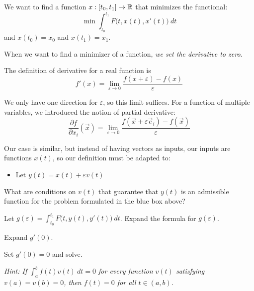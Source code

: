 \documentclass{workbook}
\begin{document}
\begin{slide}
\question

\begin{problem}

We want to find a function $x: [t_0,t_1] \to \mathbb{R}$ that minimizes the functional:
\[ \min \int_{t_0}^{t_1} F \big(t, x(t), x'(t) \big) ~dt \]
and $x(t_0)=x_0$ and $x(t_1)=x_1$.
\end{problem}

When we want to find a minimizer of a function, \textsl{we set the derivative to zero}.



\begin{parts}
	\item The definition of derivative for a real function is
	\[ f'(x) = \lim_{\varepsilon \to 0} \frac{f(x+\varepsilon)-f(x)}{\varepsilon} \]
	
	We only have one direction for $\varepsilon$, so this limit suffices. For a function of multiple variables, we introduced the notion of partial derivative:
	\[ \frac{\partial f}{\partial x_i}(\vec{x}) = \lim_{\varepsilon \to 0} \frac{f(\vec{x}+\varepsilon \vec{e}_i)-f(\vec{x})}{\varepsilon} \]
	
	Our case is similar, but instead of having vectors as inputs, our inputs are functions $x(t)$, so our definition must be adapted to:
	\begin{itemize}
		\item Let $y(t) = x(t) + \varepsilon v(t)$
	\end{itemize}	
	
	What are conditions on $v(t)$ that guarantee that $y(t)$ is an admissible function for the problem formulated in the blue box above?
	
	\item Let $\displaystyle g(\varepsilon) = \int_{t_0}^{t_1} F\big( t, y(t), y'(t) \big) ~dt$. Expand the formula for $g(\varepsilon)$.

	\item Expand $g'(0)$.

	\item Set $g'(0)=0$ and solve.
	
	\textit{Hint: If $\int_a^b f(t) v(t) ~dt=0$ for every function $v(t)$ satisfying $v(a)=v(b)=0$, then $f(t)=0$ for all $t \in (a,b)$.}

\end{parts}
\end{slide}
\end{document}
